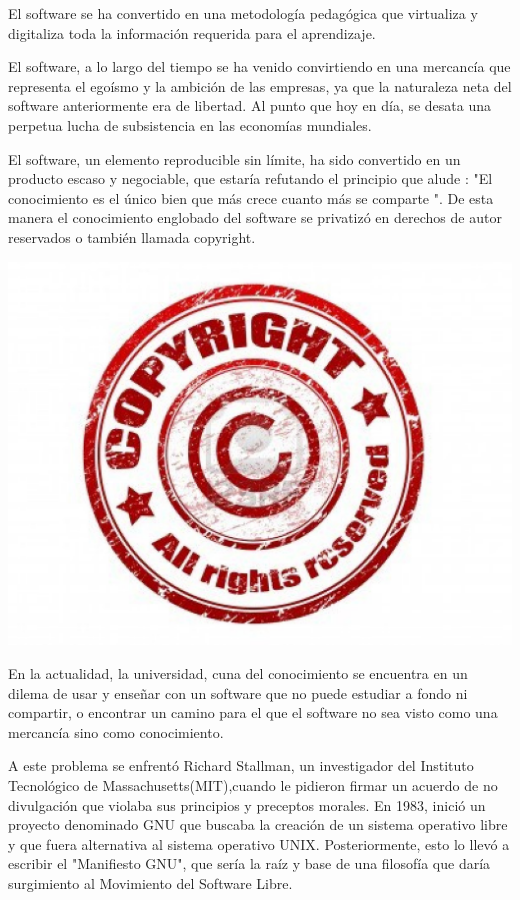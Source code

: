El software se ha convertido en una metodología pedagógica
que virtualiza y digitaliza toda la información requerida para el
aprendizaje.

El software, a lo largo del tiempo se ha venido convirtiendo en
una mercancía que representa el egoísmo y la ambición de las
empresas, ya que la naturaleza neta del software anteriormente
era de libertad. Al punto que hoy en día, se desata una perpetua
lucha de subsistencia en las economías mundiales.

El software, un elemento reproducible sin límite, ha sido
convertido en un producto escaso y negociable, que estaría
refutando el principio que alude : "El conocimiento es el único
bien que más crece cuanto más se comparte ". De esta manera
el conocimiento englobado del software se privatizó en derechos
de autor reservados o también llamada copyright.

\includegraphics[scale=0.5]{img/cp06/img0603.png}

En la actualidad, la universidad, cuna del conocimiento se
encuentra en un dilema de usar y enseñar con un software que
no puede estudiar a fondo ni compartir, o encontrar un camino
para el que el software no sea visto como una mercancía sino
como conocimiento.

A este problema se enfrentó Richard Stallman, un investigador
del Instituto Tecnológico de Massachusetts(MIT),cuando le
pidieron firmar un acuerdo de no divulgación que violaba sus
principios y preceptos morales. En 1983, inició un proyecto
denominado GNU que buscaba la creación de un sistema
operativo libre y que fuera alternativa al sistema operativo
UNIX. Posteriormente, esto lo llevó a escribir el "Manifiesto
GNU", que sería la raíz y base de una filosofía que daría
surgimiento al Movimiento del Software Libre.

